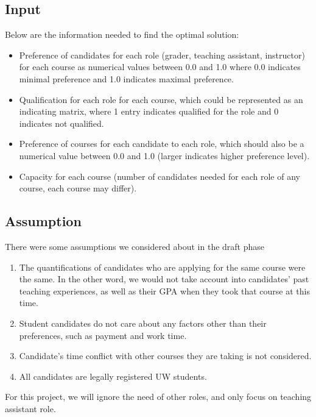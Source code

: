 \documentclass[twoside,twocolumn]{article}
\begin{document}
    \subsection{Input}
    \indent Below are the information needed to find the optimal solution:
    \begin{itemize}
        \item Preference of candidates for each role (grader, teaching assistant, instructor) for each course as numerical values between 0.0 and 
        1.0 where 0.0 indicates minimal preference and 1.0 indicates maximal preference.
        \item Qualification for each role for each course, which could be represented as an indicating matrix, where 1 entry indicates
        qualified for the role and 0 indicates not qualified.
        \item Preference of courses for each candidate to each role, which should also be a numerical value between 0.0 and 1.0 (larger indicates
        higher preference level).
        \item Capacity for each course (number of candidates needed for each role of any course, each course may differ).
    \end{itemize}
    \subsection{Assumption}
    There were some assumptions we considered about in the draft phase
    \begin{enumerate}
        \item The quantifications of candidates who are applying for the same course were the same. In the other word, we would not take
        account into candidates' past teaching experiences, as well as their GPA when they took that course at this time.
        \item Student candidates do not care about any factors other than their preferences, such as payment and work time.
        \item Candidate's time conflict with other courses they are taking is not considered.
        \item All candidates are legally registered UW students.
    \end{enumerate}
    For this project, we will ignore the need of other roles, and only focus on teaching assistant role. 
\end{document}
